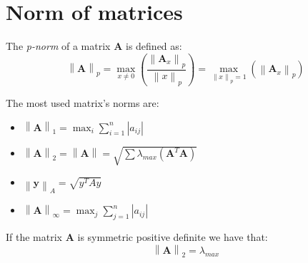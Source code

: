 \documentclass[12pt, a4paper]{report}
\begin{document}
    \section{Norm of matrices}
    \begin{definition}
        The \emph{p-norm} of a matrix $\boldsymbol{A}$ is defined as: 
        \[\left\lVert \boldsymbol{A} \right\rVert_p=\max_{x \neq 0}{\left( \dfrac{\left\lVert \boldsymbol{A}_x \right\rVert_p}{\left\lVert x \right\rVert_p} \right)}=
        \max_{\left\lVert x \right\rVert_p=1}{\left( \left\lVert \boldsymbol{A}_x \right\rVert_p \right)}\]
    \end{definition}
    The most used matrix's norms are: 
    \begin{itemize}
        \item $\left\lVert \boldsymbol{A} \right\rVert_1=\max_{i}{\sum_{i=1}^{n}{\left\lvert a_{ij} \right\rvert}}$
        \item $\left\lVert \boldsymbol{A} \right\rVert_2=\left\lVert \boldsymbol{A} \right\rVert=\sqrt{\sum{\lambda_{max}{\left( \boldsymbol{A}^T\boldsymbol{A} \right)}}}$
        \item $\left\lVert \boldsymbol{y} \right\rVert_A=\sqrt{y^TAy}$
        \item $\left\lVert \boldsymbol{A} \right\rVert_{\infty}=\max_{j}{\sum_{j=1}^{n}{\left\lvert a_{ij} \right\rvert}}$
    \end{itemize}
    \begin{proposition}
        If the matrix $\boldsymbol{A}$ is symmetric positive definite we have that: 
        \[\left\lVert \boldsymbol{A} \right\rVert_2=\lambda_{max}\]
    \end{proposition}

    
\end{document}
